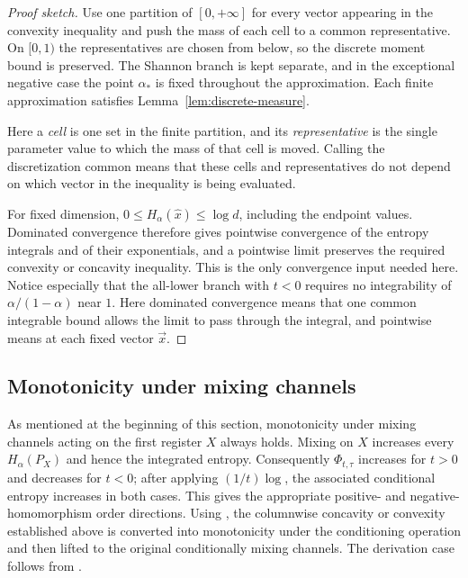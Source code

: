 \documentclass[aps,pra,11pt,onecolumn,nofootinbib,tightenlines]{revtex4-2}
\theoremstyle{definition}
\begin{document}
\begin{proof}[Proof sketch]
Use one partition of $[0,+\infty]$ for every vector appearing in the convexity
inequality and push the mass of each cell to a common representative.  On
$[0,1)$ the representatives are chosen from below, so the discrete moment bound
is preserved.  The Shannon branch is kept separate, and in the exceptional
negative case the point $\alpha_*$ is fixed throughout the approximation.  Each
finite approximation satisfies Lemma~\ref{lem:discrete-measure}.

Here a \emph{cell} is one set in the finite partition, and its
\emph{representative} is the single parameter value to which the mass of that
cell is moved.  Calling the discretization common means that these cells and
representatives do not depend on which vector in the inequality is being
evaluated.

For fixed dimension, $0\leq H_\alpha(\hat{x})\leq\log d$, including the endpoint
values.  Dominated convergence therefore gives pointwise convergence of the
entropy integrals and of their exponentials, and a pointwise limit preserves the
required convexity or concavity inequality.  This is the only convergence input
needed here.  Notice especially that the all-lower branch with $t<0$ requires no
integrability of $\alpha/(1-\alpha)$ near $1$.
Here dominated convergence means that one common integrable bound allows the
limit to pass through the integral, and pointwise means at each fixed vector
$\vec{x}$.
\end{proof}

\subsection{Monotonicity under mixing channels}
\label{sec:mixing-channels}

As mentioned at the beginning of this section, monotonicity under mixing channels
acting on the first register $X$ always holds.  Mixing on $X$ increases every
$H_\alpha(P_X)$ and hence the integrated entropy.  Consequently
$\Phi_{t,\tau}$ increases for $t>0$ and decreases for $t<0$; after applying
$(1/t)\log$, the associated conditional entropy increases in both cases.  This
gives the appropriate positive- and negative-homomorphism order directions.
Using \ParameterMainLift, the columnwise concavity or convexity established above
is converted into monotonicity under the conditioning operation and then lifted to
the original conditionally mixing channels.  The derivation case follows from
\ParameterMainDerivationLift.
\end{document}
